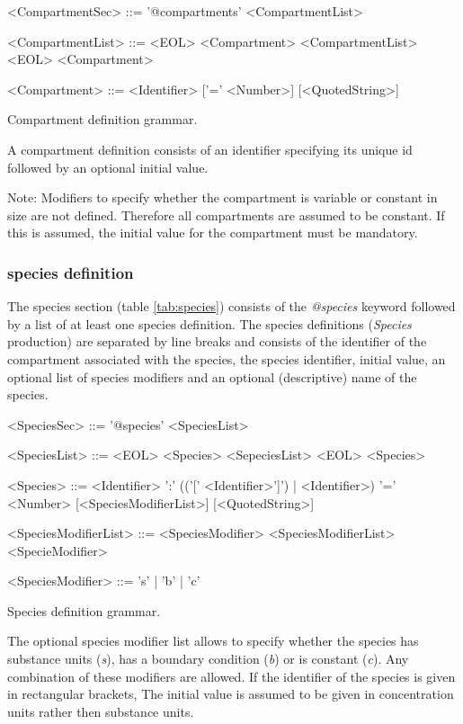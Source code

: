 \documentclass[a4paper]{article}
\begin{document}
\begin{table}[h!]
\begin{grammar}
<CompartmentSec> ::= '@compartments' <CompartmentList>

<CompartmentList> ::= <EOL> <Compartment> <CompartmentList>
  \alt <EOL> <Compartment> 
  
<Compartment> ::= <Identifier> ['=' <Number>] [<QuotedString>]
\end{grammar}
\caption{Compartment definition grammar.} \label{tab:compartment}
\end{table}
A compartment definition consists of an identifier specifying its unique id followed by an optional initial value.

Note: Modifiers to specify whether the compartment is variable or constant in size are not defined. Therefore all compartments are assumed to be constant. If this is assumed, the initial value for the compartment must be mandatory.


\subsubsection*{species definition}
The species section (table \ref{tab:species}) consists of the \emph{@species} keyword followed by a list of at least one species definition. The species definitions (\emph{Species} production) are separated by line breaks and consists of the identifier of the compartment associated with the species, the species identifier, initial value, an optional list of species modifiers and an optional (descriptive) name of the species.

\begin{table}[h!]
\begin{grammar}
<SpeciesSec> ::= '@species' <SpeciesList>

<SpeciesList> ::= <EOL> <Species> <SepeciesList> 
 \alt <EOL> <Species> 
 
<Species> ::= <Identifier> ':' (('[' <Identifier>']') | <Identifier>) '=' <Number> [<SpeciesModifierList>] [<QuotedString>]

<SpeciesModifierList> ::= <SpeciesModifier> <SpeciesModifierList>
  \alt <SpecieModifier>
  
<SpeciesModifier> ::= 's' | 'b' | 'c'
\end{grammar}
\caption{Species definition grammar.} \label{tab:species}
\end{table}

The optional species modifier list allows to specify whether the species has substance units (\emph{s}), has a boundary condition (\emph{b}) or is constant (\emph{c}). Any combination of these modifiers are allowed. If the identifier of the species is given in rectangular brackets, The initial value is assumed to be given in concentration units rather then substance units.
\end{document}
